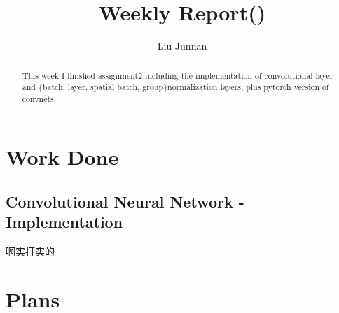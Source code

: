\documentclass{article} %
\title{Weekly Report()}
\author{
Liu Junnan
}
\begin{document}
	
\maketitle

\begin{abstract}
This week I finished assignment2 including the implementation of convolutional layer and \{batch, layer, spatial batch, group\}normalization layers, plus pytorch version of convnets. 
\end{abstract}

\section{Work Done}
\subsection{Convolutional Neural Network - Implementation}
啊实打实的

\section{Plans}
\end{document}
